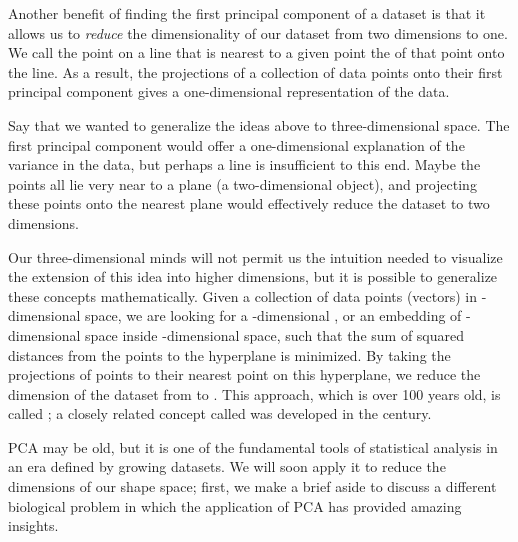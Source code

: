 Another benefit of finding the first principal component of a dataset is that it allows us to \textit{reduce} the dimensionality of our dataset from two dimensions to one. We call the point on a line that is nearest to a given point the  of that point onto the line. As a result, the projections of a collection of data points onto their first principal component gives a one-dimensional representation of the data.

Say that we wanted to generalize the ideas above to three-dimensional space. The first principal component would offer a one-dimensional explanation of the variance in the data, but perhaps a line is insufficient to this end. Maybe the points all lie very near to a plane (a two-dimensional object), and projecting these points onto the nearest plane would effectively reduce the dataset to two dimensions.

Our three-dimensional minds will not permit us the intuition needed to visualize the extension of this idea into higher dimensions, but it is possible to generalize these concepts mathematically. Given a collection of  data points (vectors) in -dimensional space, we are looking for a -dimensional , or an embedding of -dimensional space inside -dimensional space, such that the sum of squared distances from the points to the hyperplane is minimized. By taking the projections of points to their nearest point on this hyperplane, we reduce the dimension of the dataset from  to . This approach, which is over 100 years old, is called ; a closely related concept called  was developed in the  century.\\

\begin{note}[%
It can be shown that if $d_1$ is smaller than $d_2$, then the hyperplane provided by PCA of dimension $d_1$ is a subset of the hyperplane of dimension $d_2$. For example, the first principal component is always found within the plane ($d = 2$) provided by PCA.
]\end{note}

PCA may be old, but it is one of the fundamental tools of statistical analysis in an era defined by growing datasets. We will soon apply it to reduce the dimensions of our shape space; first, we make a brief aside to discuss a different biological problem in which the application of PCA has provided amazing insights.

